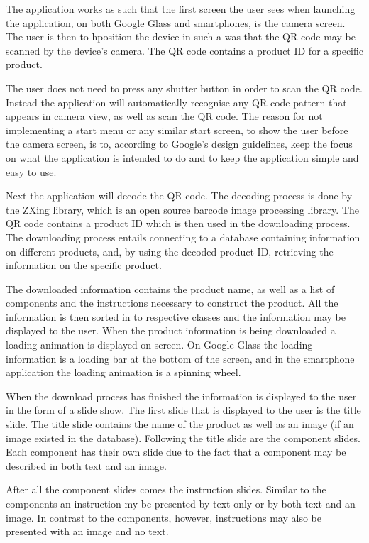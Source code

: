 The application works as such that the first screen the user sees when launching the application, on both Google Glass and smartphones, is the camera screen. The user is then to hposition the device in such a was that the QR code may be scanned by the device's camera. The QR code contains a product ID for a specific product.

The user does not need to press any shutter button in order to scan the QR code. Instead the application will automatically recognise any QR code pattern that appears in camera view, as well as scan the QR code. The reason for not implementing a start menu or any similar start screen, to show the user before the camera screen, is to, according to Google's design guidelines, keep the focus on what the application is intended to do and to keep the application simple and easy to use.

Next the application will decode the QR code. The decoding process is done by the ZXing library, which is an open source  barcode image processing library. The QR code contains a product ID which is then used in the downloading process. The downloading process entails connecting to a database containing information on different products, and, by using the decoded product ID, retrieving the information on the specific product. 

The downloaded information contains the product name, as well as a list of components and the instructions necessary to construct the product. All the information is then sorted in to respective classes and the information may be displayed to the user. When the product information is being downloaded a loading animation is displayed on screen. On Google Glass the loading information is a loading bar at the bottom of the screen, and in the smartphone application the loading animation is a spinning wheel.

When the download process has finished the information is displayed to the user in the form of a slide show. The first slide that is displayed to the user is the title slide. The title slide contains the name of the product as well as an image  (if an image existed in the database). Following the title slide are the component slides. Each component has their own slide due to the fact that a component may be described in both text and an image. 

After all the component slides comes the instruction slides. Similar to the components an instruction my be presented by text only or by both text and an image. In contrast to the components, however, instructions may also be presented with an image and no text. 


